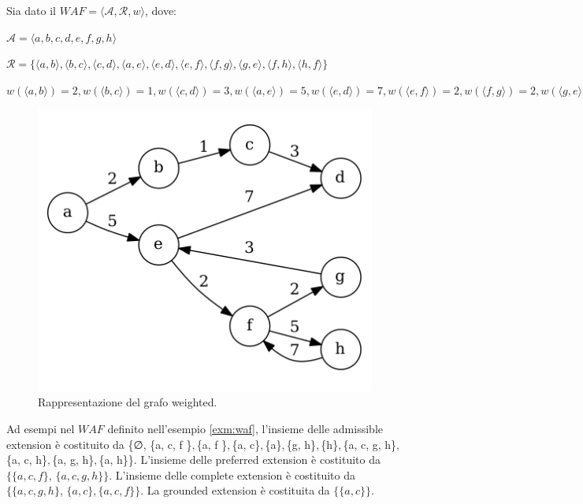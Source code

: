 \begin{exmp}
    Sia dato il $WAF  = ⟨\mathcal{A}, \mathcal{R}, w⟩$, dove:
    \begin{center}
        $\mathcal{A} = ⟨a, b, c, d, e, f, g, h⟩$
        
        $\mathcal{R} = \{⟨a, b⟩, ⟨b, c⟩, ⟨c, d⟩, ⟨a, e⟩, ⟨e, d⟩, ⟨e, f⟩, ⟨f, g⟩, ⟨g, e⟩, ⟨f, h⟩, ⟨h, f⟩\}$
        
        $w(⟨a, b⟩) = 2, w(⟨b, c⟩) = 1, w(⟨c, d⟩) = 3, w(⟨a, e⟩) = 5, w(⟨e, d⟩) = 7, w(⟨e, f⟩) = 2, w(⟨f, g⟩) = 2, w(⟨g, e⟩) = 3, w(⟨f, h⟩) = 5, w(⟨h, f⟩) = 7$
    \end{center}
    
    \begin{figure}[h]
      \includegraphics[width=\linewidth]{Immagini/example-waf-graph.png}
      \caption{Rappresentazione del grafo weighted.}
      \label{fig:waf-graph1}
    \end{figure}
    
    \label{exm:waf}
\end{exmp}

Ad esempi nel $WAF$ definito nell'esempio \ref{exm:waf}, l'insieme delle admissible extension è costituito da \{∅, \{a, c, f \}$, $\{a, f \}$, $\{a, c\}$, $\{a\}$, $\{g, h\}$, $\{h\}$, $\{a, c, g, h\}$, $\{a, c, h\}$, $\{a, g, h\}$, $\{a, h\}\}. L'insieme delle preferred extension è costituito da $\{\{a, c, f\}$, $\{a, c, g, h\}\}$. L'insieme delle complete extension è costituito da $\{\{a, c, g, h\}$, $\{a, c\}, \{a, c, f\}\}$. La grounded extension è costituita da $\{\{a, c\}\}$.

